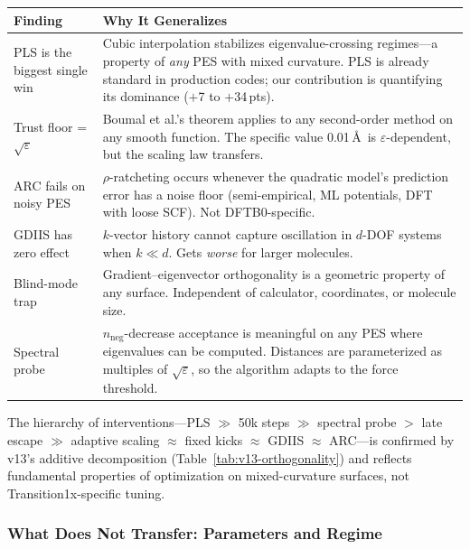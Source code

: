 \documentclass[11pt,a4paper]{article}
\theoremstyle{definition}
\begin{document}
\begin{longtable}{p{}p{}}
\toprule
\textbf{Finding} & \textbf{Why It Generalizes} \\
\midrule
\endhead

PLS is the biggest single win
& Cubic interpolation stabilizes eigenvalue-crossing regimes---a
  property of \emph{any} PES with mixed curvature.  PLS is already
  standard in production codes; our contribution is quantifying its
  dominance ($+$7 to $+$34\,pts). \\

Trust floor = $\sqrt{\varepsilon}$
& Boumal et al.'s theorem applies to any second-order method on any
  smooth function.  The specific value 0.01\,\AA\ is
  $\varepsilon$-dependent, but the scaling law transfers. \\

ARC fails on noisy PES
& $\rho$-ratcheting occurs whenever the quadratic model's prediction
  error has a noise floor (semi-empirical, ML potentials, DFT with
  loose SCF).  Not DFTB0-specific. \\

GDIIS has zero effect
& $k$-vector history cannot capture oscillation in $d$-DOF systems
  when $k \ll d$.  Gets \emph{worse} for larger molecules. \\

Blind-mode trap
& Gradient--eigenvector orthogonality is a geometric property of
  any surface.  Independent of calculator, coordinates, or molecule
  size. \\

Spectral probe
& $n_\text{neg}$-decrease acceptance is meaningful on any PES where
  eigenvalues can be computed.  Distances are parameterized as
  multiples of $\sqrt{\varepsilon}$, so the algorithm adapts to the
  force threshold. \\

\bottomrule
\end{longtable}

The hierarchy of interventions---PLS $\gg$ 50k steps $\gg$ spectral
probe $>$ late escape $\gg$ adaptive scaling $\approx$ fixed kicks
$\approx$ GDIIS $\approx$ ARC---is confirmed by v13's additive
decomposition (Table~\ref{tab:v13-orthogonality}) and reflects
fundamental properties of optimization on mixed-curvature surfaces,
not Transition1x-specific tuning.

\subsubsection{What Does Not Transfer: Parameters and Regime}
\end{document}
